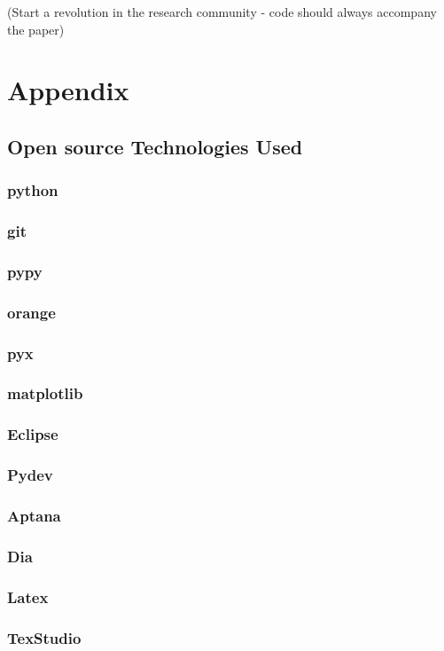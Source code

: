 \documentclass[a4paper,11pt]{report}
\begin{document}
(Start a revolution in the research community - code should always accompany the paper)

\chapter{Appendix}
\section{Open source Technologies Used}
\subsection*{python}
\subsection*{git}
\subsection*{pypy}
\subsection*{orange}
\subsection*{pyx}
\subsection*{matplotlib}
\subsection*{Eclipse}
\subsection*{Pydev}
\subsection*{Aptana}
\subsection*{Dia}
\subsection*{Latex}
\subsection*{TexStudio}
\end{document}
